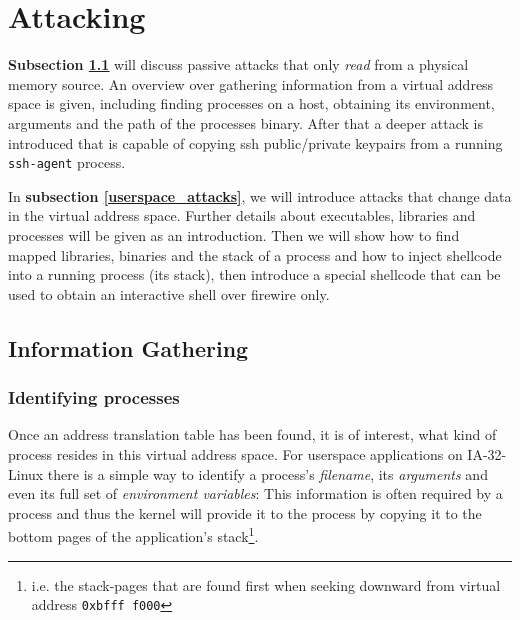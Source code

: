 %
%

\section{Attacking}

\label{attacks}

\textbf{Subsection \ref{information_gathering}} will discuss passive attacks
that only \emph{read} from a physical memory source. An overview over gathering
information from a virtual address space is given, including finding processes
on a host, obtaining its environment, arguments and the path of the processes
binary.  After that a deeper attack is introduced that is capable of copying ssh
public/private keypairs from a running \texttt{ssh-agent} process.

In \textbf{subsection \ref{userspace_attacks}}, we will introduce attacks that
change data in the virtual address space. Further details about executables,
libraries and processes will be given as an introduction. Then we will show how
to find mapped libraries, binaries and the stack of a process and how to inject
shellcode into a running process (its stack), then introduce a special shellcode
that can be used to obtain an interactive shell over firewire only.



\subsection{Information Gathering}

\label{information_gathering}

\subsubsection{Identifying processes}

\label{identifying_processes}  Once an address translation table has been found,
it is of interest, what kind of process resides in this virtual address space.
For userspace applications on IA-32-Linux there is a simple way to identify a
process's \emph{filename}, its \emph{arguments} and even its full set of
\emph{environment variables}: This information is often required by a process
and thus the kernel will provide it to the process by copying it to the bottom
pages of the application's stack\footnote{i.e.  the stack-pages that are found
first when seeking downward from virtual address \texttt{0xbfff~f000}}.

